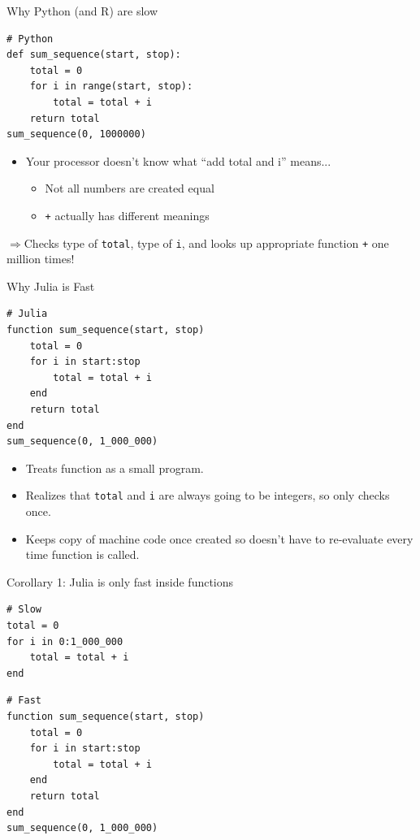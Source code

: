 \documentclass[11pt]{beamer}
\begin{document}
\begin{frame}[fragile, t]{Why Python (and R) are slow }
\begin{verbatim}
# Python
def sum_sequence(start, stop):
    total = 0
    for i in range(start, stop):
        total = total + i
    return total
sum_sequence(0, 1000000)
\end{verbatim}
\pause
\begin{itemize}
    \item Your processor doesn't know what ``add total and i'' means...
    \begin{itemize}
        \pause \item Not all numbers are created equal
        \pause \item \texttt{+} actually has different meanings
    \end{itemize}
\end{itemize}
\pause
$\Rightarrow$Checks type of \texttt{total}, type of \texttt{i}, and looks up appropriate function \texttt{+} one million times!
\end{frame}

\begin{frame}[fragile, t]{Why Julia is Fast}
\begin{verbatim}
# Julia
function sum_sequence(start, stop)
    total = 0
    for i in start:stop
        total = total + i
    end
    return total
end
sum_sequence(0, 1_000_000)
    \end{verbatim}
\begin{itemize}
    \pause \item  Treats function as a small program.
    \pause \item Realizes that \texttt{total} and \texttt{i} are always going to be integers, so only checks once.
    \pause \item Keeps copy of machine code once created so doesn't have to re-evaluate every time function is called.
\end{itemize}
\end{frame}

\begin{frame}[fragile]{Corollary 1: Julia is only fast inside functions}
\begin{verbatim}
# Slow
total = 0
for i in 0:1_000_000
    total = total + i
end
\end{verbatim}
\pause
\begin{verbatim}
# Fast
function sum_sequence(start, stop)
    total = 0
    for i in start:stop
        total = total + i
    end
    return total
end
sum_sequence(0, 1_000_000)
\end{verbatim}
\end{frame}
\end{document}
